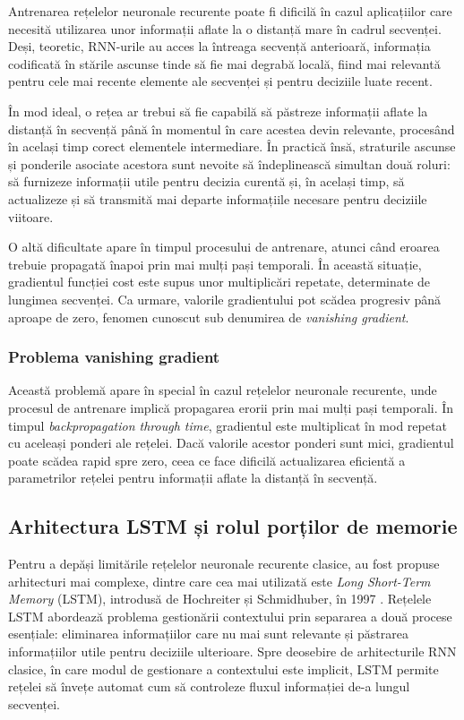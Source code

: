 \documentclass[12pt, a4paper, oneside, romanian]{teza-upb}
\begin{document}
Antrenarea rețelelor neuronale recurente poate fi dificilă
în cazul aplicațiilor care necesită utilizarea unor informații aflate la
o distanță mare în cadrul secvenței. Deși, teoretic, RNN-urile au acces
la întreaga secvență anterioară, informația codificată în stările ascunse
tinde să fie mai degrabă locală, fiind mai relevantă pentru cele mai
recente elemente ale secvenței și pentru deciziile luate recent.

În mod ideal, o rețea ar trebui să fie capabilă să păstreze informații
aflate la distanță în secvență până în momentul în care acestea devin
relevante, procesând în același timp corect elementele intermediare.
În practică însă, straturile ascunse și ponderile asociate acestora sunt
nevoite să îndeplinească simultan două roluri: să furnizeze informații
utile pentru decizia curentă și, în același timp, să actualizeze și să
transmită mai departe informațiile necesare pentru deciziile viitoare.

O altă dificultate apare în timpul procesului de antrenare, atunci când eroarea trebuie propagată înapoi prin mai mulți pași temporali.
În această situație, gradientul funcției cost este supus unor multiplicări
repetate, determinate de lungimea secvenței. Ca urmare, valorile
gradientului pot scădea progresiv până aproape de zero, fenomen
cunoscut sub denumirea de \textit{vanishing gradient}. 
        \subsubsection{Problema vanishing gradient}

Această problemă apare în special în cazul rețelelor neuronale recurente, unde procesul de antrenare implică propagarea erorii prin mai mulți pași temporali. În timpul
\textit{backpropagation through time}, gradientul este multiplicat
în mod repetat cu aceleași ponderi ale rețelei. Dacă valorile acestor
ponderi sunt mici, gradientul poate scădea rapid spre zero,
ceea ce face dificilă actualizarea eficientă a parametrilor
rețelei pentru informații aflate la distanță în secvență. \cite{jurafsky2023}
    

\subsection{Arhitectura LSTM și rolul porților de memorie}

Pentru a depăși limitările rețelelor neuronale recurente clasice, au fost
propuse arhitecturi mai complexe, dintre care cea mai utilizată este
\textit{Long Short-Term Memory} (LSTM), introdusă de Hochreiter și
Schmidhuber, în 1997 \cite{hochreiter1997long}. Rețelele LSTM abordează
problema gestionării contextului prin separarea a două procese
esențiale: eliminarea informațiilor care nu mai sunt relevante și
păstrarea informațiilor utile pentru deciziile ulterioare. Spre
deosebire de arhitecturile RNN clasice, în care modul de gestionare a
contextului este implicit, LSTM permite rețelei să învețe automat cum
să controleze fluxul informației de-a lungul secvenței.
\end{document}
